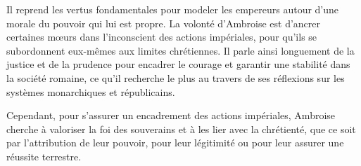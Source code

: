 \bigskip

Il reprend les vertus fondamentales pour modeler les empereurs autour d'une morale du pouvoir qui lui est propre. La volonté d'Ambroise est d'ancrer certaines mœurs dans l'inconscient des actions impériales, pour qu'ils se subordonnent eux-mêmes aux limites chrétiennes. Il parle ainsi longuement de la justice et de la prudence pour encadrer le courage et garantir une stabilité dans la société romaine, ce qu'il recherche le plus au travers de ses réflexions sur les systèmes monarchiques et républicains.

\bigskip

Cependant, pour s'assurer un encadrement des actions impériales, Ambroise cherche à valoriser la foi des souverains et à les lier avec la chrétienté, que ce soit par l'attribution de leur pouvoir, pour leur légitimité ou pour leur assurer une réussite terrestre.

\bigskip
